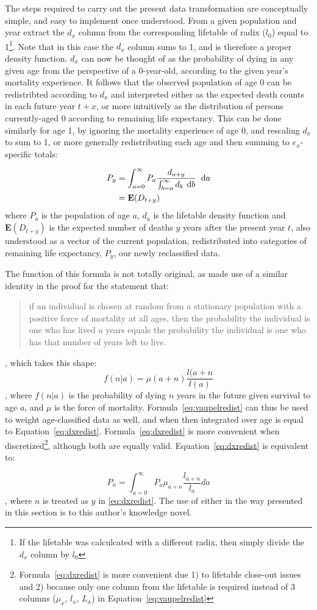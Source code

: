  \FloatBarrier

The steps required to carry out the present data transformation are conceptually
simple, and easy to implement once understood. From a given
population and year extract the $d_x$ column from the corresponding lifetable of
radix ($l_0$) equal to 1\footnote{If the lifetable was calculcated with a
different radix, then simply divide the $d_x$ column by $l_0$}. Note that in
this case the $d_x$ column sums to 1, and is therefore a proper density function. 
$d_x$ can now be thought of as the probability of dying in any given age from the
 perspective of a 0-year-old, according to the given year's mortality experience. 
 It follows that the observed population of age 0 can be redistribted according to
  $d_x$ and interpreted either as the expected death counts in each future year
$t+x$, or more intuitively as the distribution of persons currently-aged 0 according 
to remaining life expectancy. This can be done similarly for age 1, by ignoring the 
mortality experience of age 0, and rescaling $d_x$ to
sum to 1, or more generally redistributing each age and then summing to
$e_x$-specific totals:

\begin{align}
\label{eq:dxredist}
P_{y} &= \int _{a = 0} ^{\infty} P_a \frac{d_{a + y}}{\int _{b
= a} ^{\infty} d_b\, \; \mathrm{d} b} \;\; \mathrm{d} a
\\
&= \mathbf{E}(D_{t+y}) \notag
\end{align}
where $P_a$ is the population of age $a$, $d_a$ is the
lifetable density function and $\mathbf{E}(D_{t+y})$ is the expected number of
deaths $y$ years after the present year $t$, also understood as a vector of the
current population, redistributed into categories of remaining life expectancy,
$P_{y}$, our newly reclassified data.

The function of this formula is not totally original, as \citet{vaupel2009life}
made use of a similar identity in the proof for the statement that:
\begin{quotation}
if an individual is chosen at random from a stationary population with a positive force
of mortality at all ages, then the probability the individual is one who has lived $a$ years
equals the probability the individual is one who has that number of years left to live.
\end{quotation}
, which takes this shape:
\begin{equation}
\label{eq:vaupelredist}
f(n | a) = \mu (a+n) \frac{l(a+n}{l(a)}
\end{equation}
, where $f(n | a) $ is the probability of dying $n$ years in the future given
survival to age $a$, and $\mu$ is the force of mortality.
Formula~\eqref{eq:vaupelredist} can thus be used to weight age-classified data
as well, and when then integrated over age is equal to
Equation~\eqref{eq:dxredist}. Formula~\eqref{eq:dxredist} is more convenient when 
discretized\footnote{Formula~\eqref{eq:dxredist} is more convenient due 1) to lifetable 
close-out issues and 2) because only one column from the lifetable is required instead 
of 3 columns ($\mu_x$, $l_x$, $L_x$) in
Equation~\eqref{eq:vaupelredist} }, although both are equally valid.
Equation~\ref{eq:dxredist} is equivalent to:

\begin{equation}
P_n = \int _{a=0} ^\infty P_a \mu_{a+n} \frac{l_{a+n}}{l_a} da
\end{equation}
, where $n$ is treated as $y$ in \ref{eq:dxredist}.
The use of either in the way
presented in this section is to this author's knowledge novel.
